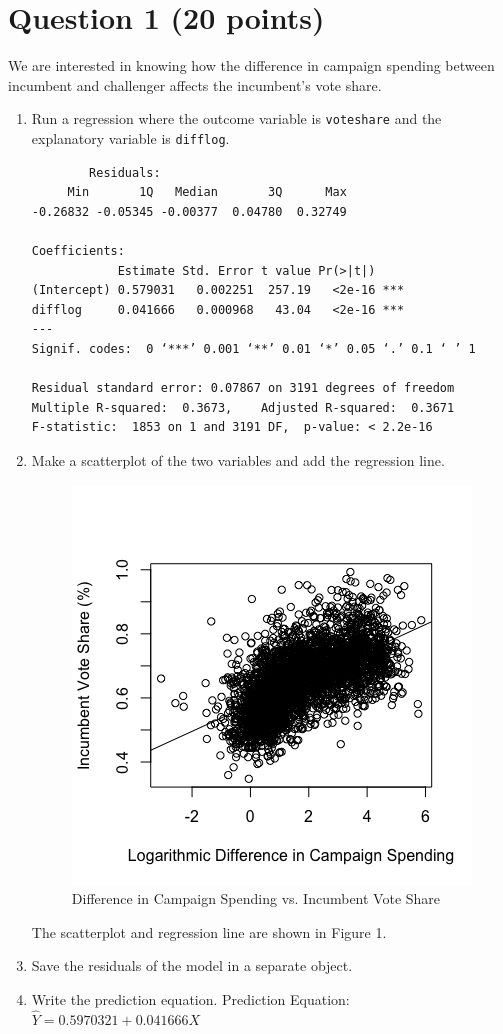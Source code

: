 \documentclass[12pt,letterpaper]{article}
\begin{document}
\section*{Question 1 (20 points)}
\vspace{.25cm}
\noindent We are interested in knowing how the difference in campaign spending between incumbent and challenger affects the incumbent's vote share. 
	\begin{enumerate}
		\item Run a regression where the outcome variable is \texttt{voteshare} and the explanatory variable is \texttt{difflog}.	
		  
		\begin{verbatim}
		Residuals:
     Min       1Q   Median       3Q      Max 
-0.26832 -0.05345 -0.00377  0.04780  0.32749 

Coefficients:
            Estimate Std. Error t value Pr(>|t|)    
(Intercept) 0.579031   0.002251  257.19   <2e-16 ***
difflog     0.041666   0.000968   43.04   <2e-16 ***
---
Signif. codes:  0 ‘***’ 0.001 ‘**’ 0.01 ‘*’ 0.05 ‘.’ 0.1 ‘ ’ 1

Residual standard error: 0.07867 on 3191 degrees of freedom
Multiple R-squared:  0.3673,	Adjusted R-squared:  0.3671 
F-statistic:  1853 on 1 and 3191 DF,  p-value: < 2.2e-16
		\end{verbatim}
		\vspace{.5cm}
		
		\item Make a scatterplot of the two variables and add the regression line.
		  
		\begin{figure}[h!]
		\caption{\footnotesize{Difference in Campaign Spending vs. Incumbent Vote Share}}
		\vspace{.1cm}
		\centering
		\label{fig:graph1}
		\includegraphics[width=.5\textwidth]{./PS3_Graph_1.png}
		\end{figure}
		The scatterplot and regression line are shown in Figure 1.
	 	\vspace{.7cm}
		\item Save the residuals of the model in a separate object.	
		  
		\vspace{.7cm}
		\item Write the prediction equation.
		Prediction Equation: ${\hat{Y} = 0.5970321 + 0.041666X}$
	\end{enumerate}
	
\end{document}

